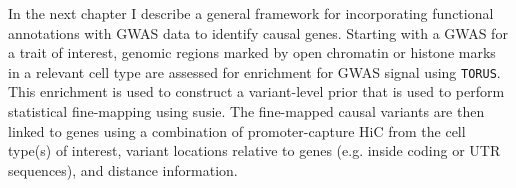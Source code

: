 In the next chapter I describe a general framework for incorporating functional annotations with GWAS data to identify causal genes.  Starting with a GWAS for a trait of interest, genomic regions marked by open chromatin or histone marks in a relevant cell type are assessed for enrichment for GWAS signal using \texttt{TORUS}\cite{torus}.  This enrichment is used to construct a variant-level prior that is used to perform statistical fine-mapping using susie\cite{susie}.  The fine-mapped causal variants are then linked to genes using a combination of promoter-capture HiC from the cell type(s) of interest, variant locations relative to genes (e.g. inside coding or UTR sequences), and distance information.  






